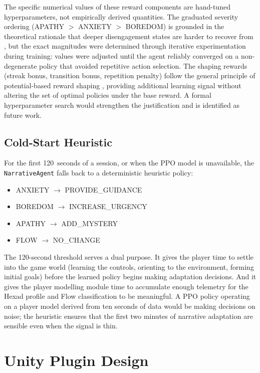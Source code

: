The specific numerical values of these reward components are hand-tuned hyperparameters, not empirically derived quantities. The graduated severity ordering (APATHY $>$ ANXIETY $>$ BOREDOM) is grounded in the theoretical rationale that deeper disengagement states are harder to recover from \citep{csikszentmihalyi1990flow, chen2007flow}, but the exact magnitudes were determined through iterative experimentation during training: values were adjusted until the agent reliably converged on a non-degenerate policy that avoided repetitive action selection. The shaping rewards (streak bonus, transition bonus, repetition penalty) follow the general principle of potential-based reward shaping \citep{ng1999policy}, providing additional learning signal without altering the set of optimal policies under the base reward. A formal hyperparameter search would strengthen the justification and is identified as future work.

\subsection{Cold-Start Heuristic}

For the first 120~seconds of a session, or when the PPO model is unavailable, the \texttt{NarrativeAgent} falls back to a deterministic heuristic policy:

\begin{itemize}
\item ANXIETY $\rightarrow$ PROVIDE\_GUIDANCE
\item BOREDOM $\rightarrow$ INCREASE\_URGENCY
\item APATHY $\rightarrow$ ADD\_MYSTERY
\item FLOW $\rightarrow$ NO\_CHANGE
\end{itemize}

The 120-second threshold serves a dual purpose. It gives the player time to settle into the game world (learning the controls, orienting to the environment, forming initial goals) before the learned policy begins making adaptation decisions. And it gives the player modelling module time to accumulate enough telemetry for the Hexad profile and Flow classification to be meaningful. A PPO policy operating on a player model derived from ten seconds of data would be making decisions on noise; the heuristic ensures that the first two minutes of narrative adaptation are sensible even when the signal is thin.

\section{Unity Plugin Design}

